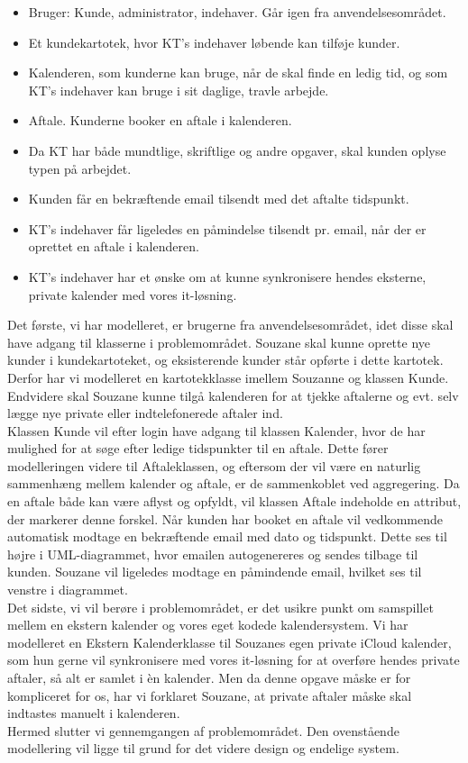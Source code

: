 \documentclass[12pt]{article}   %
\begin{document}
\begin{itemize}
\item Bruger: Kunde, administrator, indehaver. Går igen fra
	anvendelsesområdet.
\item Et kundekartotek, hvor KT's indehaver løbende kan tilføje kunder.
\item Kalenderen, som kunderne kan bruge, når de skal finde en ledig tid, og som KT's indehaver kan bruge i sit daglige, travle arbejde.
\item Aftale. Kunderne booker en aftale i kalenderen.
\item Da KT har både mundtlige, skriftlige og andre opgaver, skal kunden	oplyse typen på arbejdet.
\item Kunden får en bekræftende email tilsendt med det aftalte tidspunkt.
\item KT's indehaver får ligeledes en påmindelse tilsendt pr. email, når der er oprettet en aftale i kalenderen. 
\item KT's indehaver har et ønske om at kunne synkronisere hendes eksterne, private kalender med vores it-løsning.
\end{itemize}

Det første, vi har modelleret, er brugerne fra anvendelsesområdet, idet disse skal have adgang til klasserne i problemområdet. Souzane skal kunne oprette nye kunder i kundekartoteket, og eksisterende kunder står opførte i dette kartotek. Derfor har vi modelleret en kartotekklasse imellem Souzanne og klassen Kunde. Endvidere skal Souzane kunne tilgå kalenderen for at tjekke aftalerne og evt. selv lægge nye private eller indtelefonerede aftaler ind. \\
Klassen Kunde vil efter login have adgang til klassen Kalender, hvor de har mulighed for at søge efter ledige tidspunkter til en aftale. Dette fører modelleringen videre til Aftaleklassen, og eftersom der vil være en naturlig sammenhæng mellem kalender og aftale, er de sammenkoblet ved aggregering. Da en aftale både kan være aflyst og opfyldt, vil klassen Aftale indeholde en attribut, der markerer denne forskel. Når kunden har booket en aftale vil vedkommende automatisk modtage en bekræftende email med dato og tidspunkt. Dette ses til højre i UML-diagrammet, hvor emailen autogenereres og sendes tilbage til kunden. Souzane vil ligeledes modtage en påmindende email, hvilket ses til venstre i diagrammet. \\
Det sidste, vi vil berøre i problemområdet, er det usikre punkt om samspillet mellem en ekstern kalender og vores eget kodede kalendersystem. Vi har modelleret en Ekstern Kalenderklasse til Souzanes egen private iCloud kalender, som hun gerne vil synkronisere med vores it-løsning for at overføre hendes private aftaler, så alt er samlet i èn
kalender. Men da denne opgave måske er for kompliceret for os, har vi forklaret Souzane, at private aftaler måske skal indtastes manuelt i kalenderen. \\
Hermed slutter vi gennemgangen af problemområdet. Den ovenstående modellering vil ligge til grund for det videre design og endelige system. 
\end{document}
